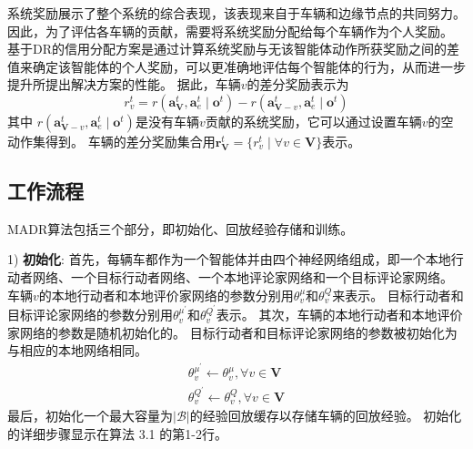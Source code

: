 系统奖励展示了整个系统的综合表现，该表现来自于车辆和边缘节点的共同努力。
因此，为了评估各车辆的贡献，需要将系统奖励分配给每个车辆作为个人奖励。
基于DR的信用分配方案是通过计算系统奖励与无该智能体动作所获奖励之间的差值来确定该智能体的个人奖励，可以更准确地评估每个智能体的行为，从而进一步提升所提出解决方案的性能。
据此，车辆$v$的差分奖励表示为\cite{foerster2018counterfactual}
\begin{equation}
r_{v}^{t}=r\left(\boldsymbol{a}_{\mathbf{V}}^{t},\boldsymbol{a}_{e}^{t} \mid \boldsymbol{o}^{t}\right)-r\left(\boldsymbol{a}_{\mathbf{V}-v}^{t},\boldsymbol{a}_{e}^{t} \mid \boldsymbol{o}^{t}\right)
\end{equation}
\noindent 其中 $r\left(\boldsymbol{a}_{\mathbf{V}-v}^{t},\boldsymbol{a}_{e}^{t} \mid \boldsymbol{o}^{t}\right)$是没有车辆$v$贡献的系统奖励，它可以通过设置车辆$v$的空动作集得到。
车辆的差分奖励集合用$\boldsymbol{r}_{\mathbf{V}}^{t}=\{ r_{v}^{t} \mid \forall v \in \mathbf{V}\}$表示。

\subsection{工作流程}
MADR算法包括三个部分，即初始化、回放经验存储和训练。

1) \textbf{初始化}: 首先，每辆车都作为一个智能体并由四个神经网络组成，即一个本地行动者网络、一个目标行动者网络、一个本地评论家网络和一个目标评论家网络。
车辆$v$的本地行动者和本地评价家网络的参数分别用$\theta_{v}^{\mu}$和$\theta_{v}^{Q}$来表示。
目标行动者和目标评论家网络的参数分别用$\theta_{v}^{\mu^{\prime}}$和$\theta_{v}^{Q^{\prime}}$表示。
其次，车辆的本地行动者和本地评价家网络的参数是随机初始化的。
目标行动者和目标评论家网络的参数被初始化为与相应的本地网络相同。
\begin{align}
	\theta_{v}^{\mu^{\prime}} \leftarrow \theta_{v}^{\mu}, \forall v \in \mathbf{V}\\
	\theta_{v}^{Q^{\prime}} \leftarrow \theta_{v}^{Q}, \forall v \in \mathbf{V}
\end{align}
最后，初始化一个最大容量为$|\mathcal{B}|$的经验回放缓存以存储车辆的回放经验。
初始化的详细步骤显示在算法 3.1 的第1-2行。


